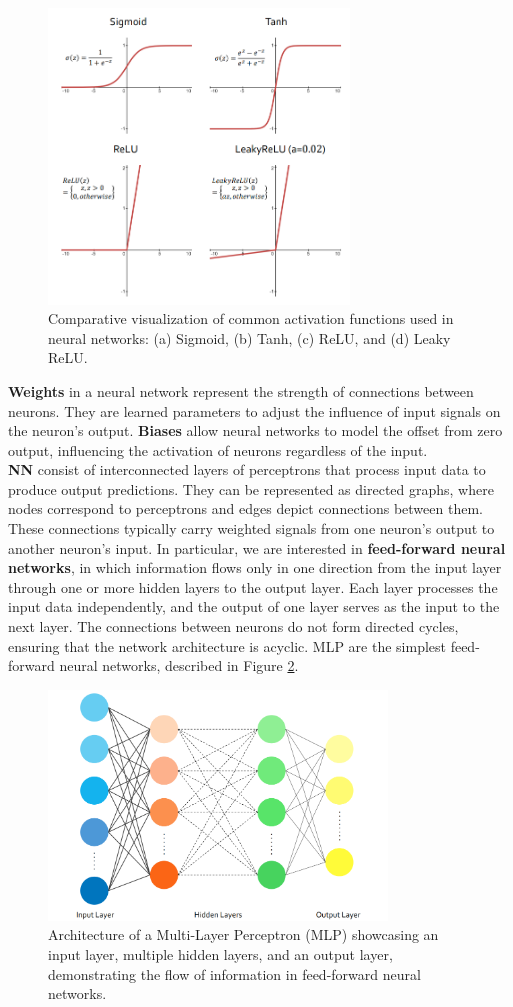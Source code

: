\begin{figure}[ht]
    \centering
    \includegraphics[width=8cm]{images/Theory-DL/ActGraphs.png}
    \caption{Comparative visualization of common activation functions used in neural networks: (a) Sigmoid, (b) Tanh, (c) ReLU, and (d) Leaky ReLU.}
    \label{fig:ActGraphs}
  \end{figure}
\textbf{Weights} in a neural network represent the strength of connections between neurons. They are learned parameters to adjust the influence of input signals on the neuron's output. \textbf{Biases} allow neural networks to model the offset from zero output, influencing the activation of neurons regardless of the input.\\
\textbf{\gls{NN}} consist of interconnected layers of perceptrons that process input data to produce output predictions. They can be represented as directed graphs, where nodes correspond to perceptrons and edges depict connections between them. These connections typically carry weighted signals from one neuron's output to another neuron's input. In particular, we are interested in \textbf{feed-forward neural networks}, in which information flows only in one direction from the input layer through one or more hidden layers to the output layer. Each layer processes the input data independently, and the output of one layer serves as the input to the next layer. The connections between neurons do not form directed cycles, ensuring that the network architecture is acyclic. \gls{MLP} are the simplest feed-forward neural networks, described in Figure \ref{fig:MLP}. 
\begin{figure}[ht]
    \centering
    \includegraphics[width=9cm]{images/Theory-DL/MLP.png}
    \caption{Architecture of a Multi-Layer Perceptron (MLP) showcasing an input layer, multiple hidden layers, and an output layer, demonstrating the flow of information in feed-forward neural networks.}
    \label{fig:MLP}
  \end{figure}

